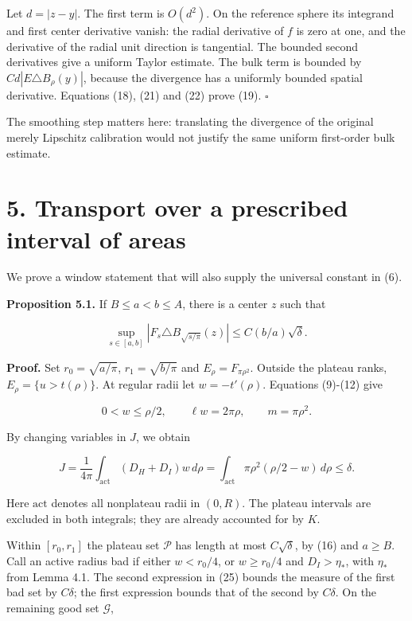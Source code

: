 \documentclass[11pt]{article}
\begin{document}
Let \(d=|z-y|\). The first term is \(O(d^2)\). On the reference sphere
its integrand and first center derivative vanish: the radial derivative
of \(f\) is zero at one, and the derivative of the radial unit direction
is tangential. The bounded second derivatives give a uniform Taylor
estimate. The bulk term is bounded by \(Cd|E\triangle B_\rho(y)|\),
because the divergence has a uniformly bounded spatial derivative.
Equations (18), (21) and (22) prove (19). \(\square\)

The smoothing step matters here: translating the divergence of the
original merely Lipschitz calibration would not justify the same uniform
first-order bulk estimate.

\section{5. Transport over a prescribed interval of
areas}\label{transport-over-a-prescribed-interval-of-areas}

We prove a window statement that will also supply the universal constant
in (6).

\textbf{Proposition 5.1.} If \(B\le a<b\le A\), there is a center \(z\)
such that

\[
\sup_{s\in[a,b]}|F_s\triangle B_{\sqrt{s/\pi}}(z)|
\le C(b/a)\sqrt\delta.
\tag{23}
\]

\textbf{Proof.} Set \(r_0=\sqrt{a/\pi}\), \(r_1=\sqrt{b/\pi}\) and
\(E_\rho=F_{\pi\rho^2}\). Outside the plateau ranks,
\(E_\rho=\{u>t(\rho)\}\). At regular radii let \(w=-t'(\rho)\).
Equations (9)-(12) give

\[
0<w\le\rho/2,\qquad \ell w=2\pi\rho,\qquad m=\pi\rho^2.
\tag{24}
\]

By changing variables in \(J\), we obtain

\[
J=\frac1{4\pi}\int_{\mathrm{act}}(D_H+D_I)w\,d\rho
=\int_{\mathrm{act}}\pi\rho^2(\rho/2-w)\,d\rho\le\delta.
\tag{25}
\]

Here \(\mathrm{act}\) denotes all nonplateau radii in \((0,R)\). The
plateau intervals are excluded in both integrals; they are already
accounted for by \(K\).

Within \([r_0,r_1]\) the plateau set \(\mathcal P\) has length at most
\(C\sqrt\delta\), by (16) and \(a\ge B\). Call an active radius bad if
either \(w<r_0/4\), or \(w\ge r_0/4\) and \(D_I>\eta_*\), with
\(\eta_*\) from Lemma 4.1. The second expression in (25) bounds the
measure of the first bad set by \(C\delta\); the first expression bounds
that of the second by \(C\delta\). On the remaining good set
\(\mathcal G\),
\end{document}
